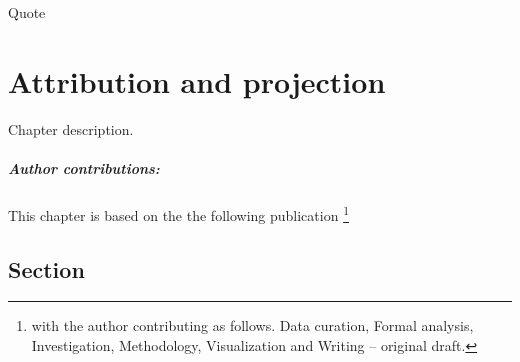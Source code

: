 \begin{savequote}[8cm]
    Quote
\end{savequote}
    
\chapter{\label{ch2}Attribution and projection} 

Chapter description.
\small\paragraph{Author contributions:} This chapter is based on the the following publication \footnote{with the author contributing as follows. Data curation, Formal analysis, Investigation, Methodology, Visualization and Writing -- original draft.} \par\vspace{1em}

\minitoc

\clearpage

\section{Section}

    \blindtext